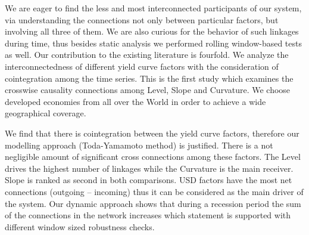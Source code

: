 \documentclass[12pt,bibliography=totoc]{article}
\begin{document}
We are eager to find the less and most interconnected participants of our system, via understanding the connections not only between particular factors, but involving all three of them. We are also curious for the behavior of such linkages during time, thus besides static analysis we performed rolling window-based tests as well. Our contribution to the existing literature is fourfold. We analyze the interconnectedness of different yield curve factors with the consideration of cointegration among the time series. This is the first study which examines the crosswise causality connections among Level, Slope and Curvature. We choose developed economies from all over the World in order to achieve a wide geographical coverage. %

We find that there is cointegration between the yield curve factors, therefore our modelling approach (Toda-Yamamoto method) is justified. There is a not negligible amount of significant cross connections among these factors. The Level drives the highest number of linkages while the Curvature is the main receiver. Slope is ranked as second in both comparisons. USD factors have the most net connections (outgoing – incoming) thus it can be considered as the main driver of the system. Our dynamic approach shows that during a recession period the sum of the connections in the network increases which statement is supported with different window sized robustness checks.



\end{document}
